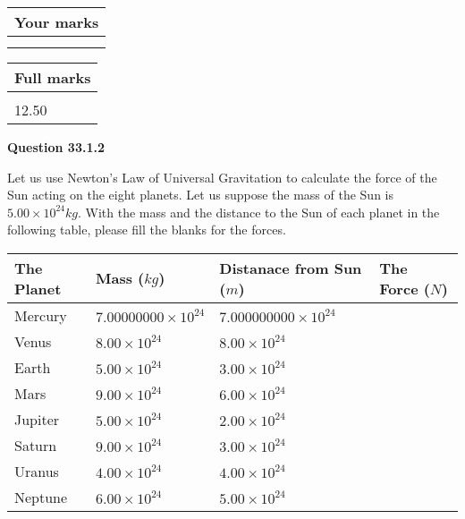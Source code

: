 \documentclass[12pt]{article}
\begin{document}
 
 
 

 
 
\vspace{0.3in}
  
\vspace{0.2in}
  
         \begin{tabular}{|l|}
\hline
 Your marks  \\
\hline
 \\ 
 \\ 
\hline
\end{tabular}
\hspace{0.05in} \begin{tabular}{|l|}
\hline
 Full marks  \\
\hline
 \\ 
12.50 \\
\hline
\end{tabular}
{\textbf{\Large{Question
33.1.2 
}}}
  
  
Let us use Newton's Law of Universal Gravitation to calculate the force
of the Sun acting on the eight planets. Let us suppose the mass of the
Sun is $ %
5.00 \times 10^{24} kg$. With the mass and the
distance to the Sun of each planet in the following table, please fill
the blanks for the forces.
 
\vspace{0.2in}
 
 
\begin{tabular}{|l|l|l|l|}
\hline
The Planet & Mass ($kg$) & Distanace from Sun ($m$) & The Force ($N$)\\
\hline
Mercury  &
           $ %
7.00000000 \times 10^{24} $   &
             $ %
7.000000000 \times 10^{24} $    &
\\  \hline
Venus    &
           $ %
8.00 \times 10^{24} $    &
             $ %
8.00 \times 10^{24} $    &
\\  \hline
Earth    &
           $ %
5.00 \times 10^{24} $    &
             $ %
3.00 \times 10^{24} $    &
\\   \hline
Mars     &
           $ %
9.00 \times 10^{24} $    &
             $ %
6.00 \times 10^{24} $    &
\\   \hline
Jupiter  &
           $ %
5.00 \times 10^{24} $    &
             $ %
2.00 \times 10^{24} $    &
\\  \hline
Saturn   &
           $ %
9.00 \times 10^{24}$    &
             $ %
3.00 \times 10^{24}$    &
\\  \hline
Uranus   &
           $ %
4.00 \times 10^{24} $    &
             $ %
4.00 \times 10^{24} $    &
\\  \hline
Neptune  &
           $ %
6.00 \times 10^{24} $    &
             $ %
5.00 \times 10^{24} $    &
\\  \hline
 
\end{tabular}
 
\end{document}
